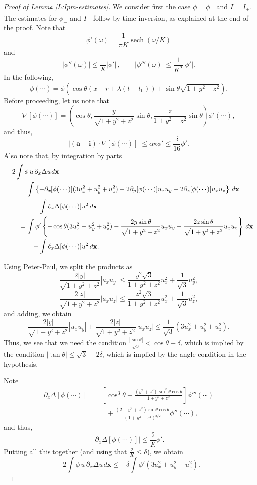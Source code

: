 \documentclass[12pt,letterpaper]{amsart}
\newcommand{\indentalign}{\hspace{0.3in}&\hspace{-0.3in}}
\newcommand{\sech}{\operatorname{sech}}
\theoremstyle{remark}
\numberwithin{equation}{section}
\numberwithin{theorem}{section}
\numberwithin{table}{section}
\begin{document}
\begin{proof}[Proof of Lemma \ref{L:Ipm-estimates}]
We consider first the case $\phi=\phi_+$ and $I=I_+$.  The estimates for $\phi_-$ and $I_-$ follow by time inversion, as explained at the end of the proof.   Note that
$$
\phi'(\omega) = \frac{1}{\pi K} \sech(\omega/K)
$$
and
$$
|\phi''(\omega)| \leq \frac{1}{K} |\phi'| \,, \qquad |\phi'''(\omega)| \leq \frac{1}{K^2} |\phi'|.
$$
In the following, 
$$
\phi(\cdots) = \phi( \cos \theta(x-r+\lambda(t-t_0)) +  \sin \theta \sqrt{1+y^2+z^2} ).
$$
Before proceeding, let us note that
$$
\nabla [\phi(\cdots)] =  ( \cos \theta, \frac{y}{\sqrt{1+y^2+z^2}} \sin \theta, \frac{z}{1+y^2+z^2} \sin \theta) \phi'(\cdots),
$$
and thus,
$$
| (\mathbf{a}- \mathbf{i}) \cdot \nabla[ \phi(\cdots) ]| \leq \alpha \kappa \phi' \leq \frac{\delta}{16} \phi'.
$$
Also note that, by integration by parts
\begin{align*}
\indentalign -2\int \phi \, u \, \partial_x \Delta u \,d \mathbf{x} \\
&= \int \left\{ -\partial_x[ \phi(\cdots)] (3u_x^2+u_y^2+u_z^2) - 2\partial_y[\phi(\cdots)] u_xu_y - 2\partial_z[ \phi(\cdots)] u_x u_z \right\} \, d\mathbf{x}\\
& \qquad+ \int \partial_x \Delta[ \phi(\cdots) ] u^2 \,d \mathbf{x} \\
&= \int \phi' \left\{  -\cos\theta  (3u_x^2+u_y^2+u_z^2) - \frac{2y\sin \theta}{\sqrt{1+y^2+z^2}} u_xu_y - \frac{2z\sin \theta}{\sqrt{1+y^2+z^2}} u_x u_z \right\} \, d\mathbf{x}\\
& \qquad+ \int \partial_x \Delta[ \phi(\cdots) ] u^2 \,d \mathbf{x}.
\end{align*}

Using Peter-Paul, we split the products as
$$ 
\frac{2|y| }{\sqrt{1+y^2+z^2}} |u_x u_y| \leq \frac{ y^2 \sqrt{3}}{1+y^2+z^2} u_x^2 + \frac{1}{\sqrt{3}} u_y^2,
$$
$$ 
\frac{2|z| }{\sqrt{1+y^2+z^2}} |u_x u_z| \leq \frac{ z^2 \sqrt{3}}{1+y^2+z^2} u_x^2 + \frac{1}{\sqrt{3}} u_z^2,
$$
and adding, we obtain
$$
\frac{2|y| }{\sqrt{1+y^2+z^2}} |u_x u_y| + \frac{2|z| }{\sqrt{1+y^2+z^2}} |u_x u_z| \leq \frac{1}{\sqrt{3}}(3u_x^2+u_y^2+u_z^2).
$$
Thus, we see that we need the condition $\frac{|\sin \theta|}{\sqrt{3}} < \cos \theta - \delta$, which is implied by the condition $|\tan \theta| \leq \sqrt{3}- 2\delta$, which is implied by the angle condition in the hypothesis.

Note 
\begin{align*}
\partial_x \Delta [ \phi(\cdots)] &= \left[\cos^3\theta + \frac{ (y^2+z^2) \sin^2\theta \cos\theta}{1+y^2+z^2} \right]\phi'''(\cdots) \\ 
& \qquad + \frac{(2+y^2+z^2) \sin \theta \cos \theta}{ (1+y^2+z^2)^{3/2} } \phi''(\cdots),
\end{align*}
and thus,
$$
|\partial_x \Delta [ \phi(\cdots)] | \leq \frac{2}{K} \phi'.
$$
Putting all this together (and using that $\frac{2}{K} \leq \delta$), we obtain
$$
-2\int \phi \, u \, \partial_x \Delta u \,d \mathbf{x}  \leq - \delta \int \phi' (3u_x^2+u_y^2+u_z^2).
$$


\end{proof}
\end{document}

